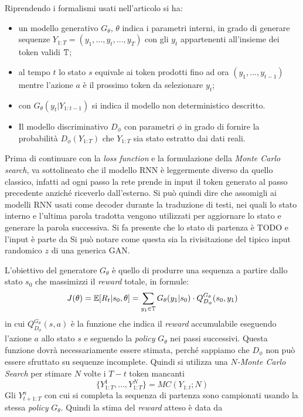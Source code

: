 Riprendendo i formalismi usati nell'articolo si ha:
\begin{itemize}
  \item un modello generativo $G_\theta$, $\theta$ indica i parametri interni, in grado di generare sequenze $Y_{1:T} = ( y_1, \dots , y_t, \dots , y_T)$ con gli $y_t$ appartenenti all'insieme dei token validi $\mathbb{T}$;
  \item al tempo $t$ lo stato $s$ equivale ai token prodotti fino ad ora $(y_1, \dots , y_{t-1})$ mentre l'azione $a$ è il prossimo token da selezionare $y_t$;
  \item con $G_\theta (y_t | Y_{1 : t-1} )$ si indica il modello non deterministico descritto.

  \item Il modello discriminativo $D_\phi$ con parametri $\phi$ in grado di fornire la probabilità $D_\phi ( Y_{1:T})$ che $Y_{1:T}$ sia stato estratto dai dati reali.
\end{itemize}

Prima di continuare con la \emph{loss function} e la formulazione della \emph{Monte Carlo search}, 
va sottolineato che il modello RNN è leggermente diverso da quello classico, infatti ad ogni passo la rete prende in input il token generato al passo precedente anziché riceverlo dall'esterno.
Si può quindi dire che assomigli ai modelli RNN usati come decoder durante la traduzione di testi, nei quali lo stato interno e l'ultima parola tradotta vengono utilizzati per aggiornare lo stato e generare la parola successiva.
Si fa presente che lo stato di partenza è TODO e l'input è parte da 
Si può notare come questa sia la rivisitazione del tipico input randomico $z$ di una generica GAN.

L'obiettivo del generatore $ G_\theta $ è quello di produrre una sequenza a partire dallo stato $s_0$ che massimizzi il \emph{reward} totale, in formule:
$$
J(\theta) = \mathbb{E}[R_t | s_0, \theta ] =
\sum_{y_1 \in \mathbb{T}}
G_\theta ( y_1 | s_0) \cdot
Q_{D_\phi}^{G_\theta} ( s_0, y_1)
$$
in cui $Q_{D_\phi}^{G_\theta} ( s, a)$ è la funzione che indica il \emph{reward} accumulabile eseguendo l'azione $a$ allo stato $s$ e seguendo la \emph{policy} $G_\theta$ nei passi successivi.
Questa funzione dovrà necessariamente essere stimata, perché sappiamo che $D_\phi$ non può essere sfruttato su sequenze incomplete.
Quindi si utilizza una \emph{$N$-Monte Carlo Search} per stimare $N$ volte i $T-t$ token mancanti
$$
\{ 
  Y_{1:T}^1,
  \dots,
  Y_{1:T}^N
\}
=
MC (Y_{1:t}; N)
$$
Gli $ Y_{t+1:T}^n $ con cui si completa la sequenza di partenza sono campionati usando la stessa \emph{policy} $G_\theta$.
Quindi la stima del \emph{reward} atteso è data da

